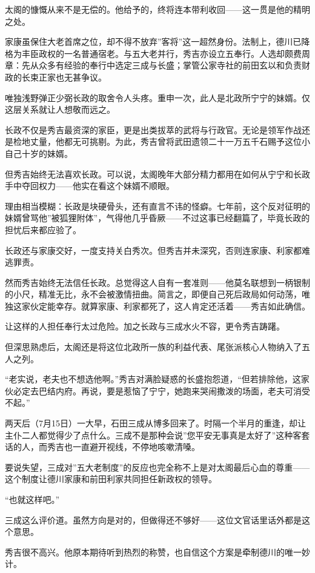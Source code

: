 \documentclass[
]{article}
\begin{document}
太阁的慷慨从来不是无偿的。他给予的，终将连本带利收回------这一贯是他的精明之处。

家康虽保住大老首席之位，却不得不放弃''客将''这一超然身份。法制上，德川已降格为丰臣政权的一名普通宿老。与五大老并行，秀吉亦设立五奉行。人选却颇费周章：先从众多有经验的奉行中选定三成与长盛；掌管公家寺社的前田玄以和负责财政的长束正家也无甚争议。

唯独浅野弹正少弼长政的取舍令人头疼。重申一次，此人是北政所宁宁的妹婿。仅这层关系就让人想敬而远之。

长政不仅是秀吉最资深的家臣，更是出类拔萃的武将与行政官。无论是领军作战还是检地丈量，他都无可挑剔。为此，秀吉曾将武田遗领二十一万五千石赐予这位小自己十岁的妹婿。

但秀吉始终无法喜欢长政。可以说，太阁晚年大部分精力都用在如何从宁宁和长政手中夺回权力------他实在看这个妹婿不顺眼。

理由相当模糊：长政是块硬骨头，还有直言不讳的怪癖。七年前，这个反对征明的妹婿曾骂他''被狐狸附体''，气得他几乎昏厥------不过这事已经翻篇了，毕竟长政的担忧后来都应验了。

长政还与家康交好，一度支持关白秀次。但秀吉并未深究，否则连家康、利家都难逃罪责。

然而秀吉始终无法信任长政。总觉得这人自有一套准则------他莫名联想到一柄银制的小尺，精准无比，永不会被激情扭曲。简言之，即便自己死后政局如何动荡，唯独这家伙定能幸存。就算家康、利家都死了，这人肯定还活着------秀吉如此确信。

让这样的人担任奉行太过危险。加之长政与三成水火不容，更令秀吉踌躇。

但深思熟虑后，太阁还是将这位北政所一族的利益代表、尾张派核心人物纳入了五人之列。

``老实说，老夫也不想选他啊。''秀吉对满脸疑惑的长盛抱怨道，``但若排除他，这家伙必定去巴结内府。再说，要是惹恼了宁宁，她跑来哭闹撒泼的场面，老夫可消受不起。''

两天后（7月15日）一大早，石田三成从博多回来了。时隔一个半月的重逢，却让主仆二人都觉得少了点什么。三成不是那种会说''您平安无事真是太好了''这种客套话的人，而秀吉也一直避开视线，不停地咳嗽清嗓。

要说失望，三成对''五大老制度''的反应也完全称不上是对太阁最后心血的尊重------这个制度让德川家康和前田利家共同担任新政权的领导。

``也就这样吧。''

三成这么评价道。虽然方向是对的，但做得还不够好------这位文官话里话外都是这个意思。

秀吉很不高兴。他原本期待听到热烈的称赞，也自信这个方案是牵制德川的唯一妙计。
\end{document}
